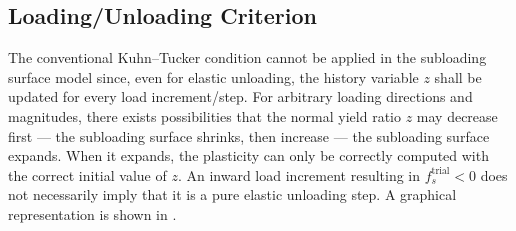 \subsection{Loading/Unloading Criterion}\label{sec:correct_loading_criterion}
The conventional Kuhn--Tucker condition cannot be applied in the subloading surface model since, even for elastic unloading, the history variable $z$ shall be updated for every load increment/step.
For arbitrary loading directions and magnitudes, there exists possibilities that the normal yield ratio $z$ may decrease first --- the subloading surface shrinks, then increase --- the subloading surface expands.
When it expands, the plasticity can only be correctly computed with the correct initial value of $z$.
An inward load increment resulting in $f_s^\text{trial}<0$ does not necessarily imply that it is a pure elastic unloading step.
A graphical representation is shown in .
